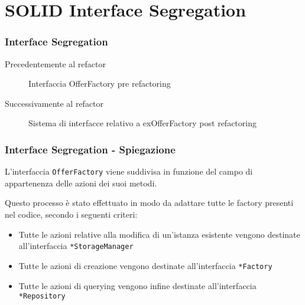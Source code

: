 \section{SOLID Interface Segregation}
\begin{frame}
    \frametitle{Interface Segregation}

    \begin{minipage}{.48\textwidth}
        Precedentemente al refactor
        \begin{figure}
            \centering
            \caption{Interfaccia OfferFactory pre refactoring}
        \end{figure}
    \end{minipage}
    \hfill
    \begin{minipage}{.48\textwidth}
        Successivamente al refactor
        \begin{figure}
            \centering
            \caption{Sistema di interfacce relativo a exOfferFactory post refactoring}
        \end{figure}
    \end{minipage}
\end{frame}

\begin{frame}
    \frametitle{Interface Segregation - Spiegazione}
    L'interfaccia \texttt{OfferFactory} viene suddivisa in funzione del campo di appartenenza delle azioni dei suoi metodi.

    Questo processo è stato effettuato in modo da adattare tutte le factory presenti nel codice, secondo i seguenti criteri:
    \begin{itemize}
        \item<1-> Tutte le azioni relative alla modifica di un'istanza esistente vengono destinate all'interfaccia \texttt{*StorageManager}
        \item<2-> Tutte le azioni di creazione vengono destinate all'interfaccia \texttt{*Factory}
        \item <3-> Tutte le azioni di querying vengono infine destinate all'interfaccia \texttt{*Repository}
    \end{itemize}
\end{frame}
